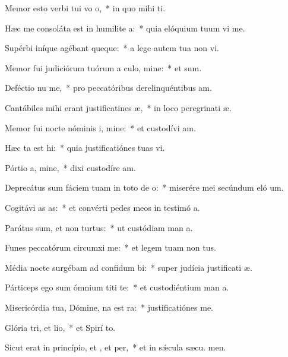 \item Memor esto verbi tui vo o,~* in quo mihi  ti.
\item Hæc me consoláta est in humilite a:~* quia elóquium tuum vi me.
\item Supérbi iníque agébant queque:~* a lege autem tua non vi.
\item Memor fui judiciórum tuórum a culo, mine:~* et  sum.
\item Deféctio nu me,~* pro peccatóribus derelinquéntibus  am.
\item Cantábiles mihi erant justificatines æ,~* in loco peregrinati æ.
\item Memor fui nocte nóminis i, mine:~* et custodívi  am.
\item Hæc ta est hi:~* quia justificatiónes tuas vi.
\item Pórtio a, mine,~* dixi custodíre  am.
\item Deprecátus sum fáciem tuam in toto de o:~* miserére mei secúndum eló um.
\item Cogitávi as as:~* et convérti pedes meos in testimó a.
\item Parátus sum, et non  turtus:~* ut custódiam man a.
\item Funes peccatórum circumxi  me:~* et legem tuam non  tus.
\item Média nocte surgébam ad confidum bi:~* super judícia justificati æ.
\item Párticeps ego sum ómnium titi te:~* et custodiéntium man a.
\item Misericórdia tua, Dómine, na est ra:~* justificatiónes   me.
\item Glória tri, et lio,~* et Spirí to.
\item Sicut erat in princípio, et , et per,~* et in sǽcula sæcu. men.
